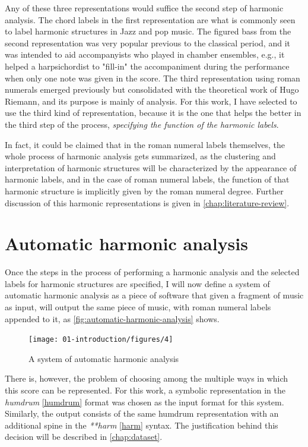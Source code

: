 Any of these three representations would suffice the second step of harmonic analysis. The chord labels in the first representation are what is commonly seen to label harmonic structures in Jazz and pop music. The figured bass from the second representation was very popular previous to the classical period, and it was intended to aid accompanyists who played in chamber ensembles, e.g., it helped a harpsichordist to "fill-in" the accompaniment during the performance when only one note was given in the score. The third representation using roman numerals emerged previously but consolidated with the theoretical work of Hugo Riemann, and its purpose is mainly of analysis. For this work, I have selected to use the third kind of representation, because it is the one that helps the better in the third step of the process, \emph{specifying the function of the harmonic labels}.

In fact, it could be claimed that in the roman numeral labels themselves, the whole process of harmonic analysis gets summarized, as the clustering and interpretation of harmonic structures will be characterized by the appearance of harmonic labels, and in the case of roman numeral labels, the function of that harmonic structure is implicitly given by the roman numeral degree. Further discussion of this harmonic representations is given in  \autoref{chap:literature-review}.

\section{Automatic harmonic analysis}
Once the steps in the process of performing a harmonic analysis and the selected labels for harmonic structures are specified, I will now define a system of automatic harmonic analysis as a piece of software that given a fragment of music as input, will output the same piece of music, with roman numeral labels appended to it, as \autoref{fig:automatic-harmonic-analysis} shows.

\begin{figure}[h]
  \centering
    \texttt{[image: 01-introduction/figures/4]}
  \caption{A system of automatic harmonic analysis}
  \label{fig:automatic-harmonic-analysis}
\end{figure}

There is, however, the problem of choosing among the multiple ways in which this score can be represented. For this work, a symbolic representation in the \emph{humdrum} \ref{humdrum} format was chosen as the input format for this system. Similarly, the output consists of the same humdrum representation with an additional spine in the \emph{**harm} \ref{harm} syntax. The justification behind this decision will be described in \autoref{chap:dataset}.

